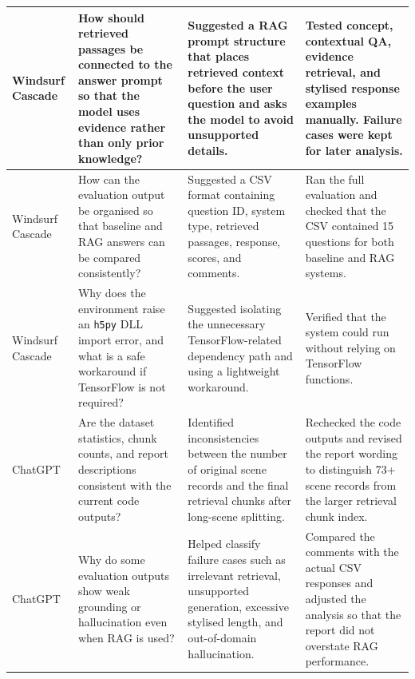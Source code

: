 \documentclass[10pt,conference]{IEEEtran}
\begin{document}
\begin{table}[!t]
\begin{tabularx}{\textwidth}{p{2.2cm} p{3.4cm} p{3.4cm} X}
\midrule

Windsurf Cascade 
& How should retrieved passages be connected to the answer prompt so that the model uses evidence rather than only prior knowledge? 
& Suggested a RAG prompt structure that places retrieved context before the user question and asks the model to avoid unsupported details. 
& Tested concept, contextual QA, evidence retrieval, and stylised response examples manually. Failure cases were kept for later analysis. \\

\midrule

Windsurf Cascade 
& How can the evaluation output be organised so that baseline and RAG answers can be compared consistently? 
& Suggested a CSV format containing question ID, system type, retrieved passages, response, scores, and comments. 
& Ran the full evaluation and checked that the CSV contained 15 questions for both baseline and RAG systems. \\

\midrule

Windsurf Cascade 
& Why does the environment raise an \texttt{h5py} DLL import error, and what is a safe workaround if TensorFlow is not required? 
& Suggested isolating the unnecessary TensorFlow-related dependency path and using a lightweight workaround. 
& Verified that the system could run without relying on TensorFlow functions. \\

\midrule

ChatGPT 
& Are the dataset statistics, chunk counts, and report descriptions consistent with the current code outputs? 
& Identified inconsistencies between the number of original scene records and the final retrieval chunks after long-scene splitting. 
& Rechecked the code outputs and revised the report wording to distinguish 73+ scene records from the larger retrieval chunk index. \\

\midrule

ChatGPT 
& Why do some evaluation outputs show weak grounding or hallucination even when RAG is used? 
& Helped classify failure cases such as irrelevant retrieval, unsupported generation, excessive stylised length, and out-of-domain hallucination. 
& Compared the comments with the actual CSV responses and adjusted the analysis so that the report did not overstate RAG performance. \\

\midrule


\end{tabularx}
\end{table}
\end{document}
